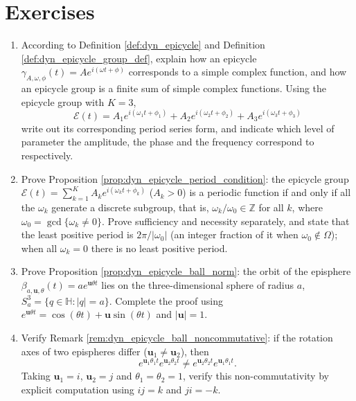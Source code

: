 \section*{Exercises}

\begin{enumerate}[leftmargin=3em, label=\textbf{Exercise \arabic*}]
    \item According to Definition \ref{def:dyn_epicycle} and Definition \ref{def:dyn_epicycle_group_def},
    explain how an epicycle $\gamma_{A,\omega,\phi}(t)=Ae^{i(\omega t+\phi)}$
    corresponds to a simple complex function, and how an epicycle group is a finite sum of simple complex functions.
    Using the epicycle group with $K=3$,
    \[
    \mathcal{E}(t)=A_1e^{i(\omega_1 t+\phi_1)}+A_2e^{i(\omega_2 t+\phi_2)}+A_3e^{i(\omega_3 t+\phi_3)}
    \]
    write out its corresponding period series form, and indicate which level of parameter the amplitude, the phase and the frequency correspond to respectively.

    \item Prove Proposition \ref{prop:dyn_epicycle_period_condition}:
    the epicycle group $\mathcal{E}(t)=\sum_{k=1}^K A_k e^{i(\omega_k t+\phi_k)}$ ($A_k>0$)
    is a periodic function if and only if all the $\omega_k$ generate a discrete subgroup,
    that is, $\omega_k/\omega_0\in\mathbb{Z}$ for all $k$, where $\omega_0=\gcd\{\omega_k\ne0\}$.
    Prove sufficiency and necessity separately, and state that the least positive period is $2\pi/\lvert\omega_0\rvert$ (an integer fraction of it when $\omega_0\notin\Omega$); when all $\omega_k=0$ there is no least positive period.

    \item Prove Proposition \ref{prop:dyn_epicycle_ball_norm}:
    the orbit of the episphere $\beta_{a,\mathbf{u},\theta}(t)=ae^{\mathbf{u}\theta t}$
    lies on the three-dimensional sphere of radius $a$, $S^3_a=\{q\in\mathbb{H}:|q|=a\}$.
    Complete the proof using $e^{\mathbf{u}\theta t}=\cos(\theta t)+\mathbf{u}\sin(\theta t)$
    and $|\mathbf{u}|=1$.

    \item Verify Remark \ref{rem:dyn_epicycle_ball_noncommutative}:
    if the rotation axes of two epispheres differ ($\mathbf{u}_1\neq\mathbf{u}_2$), then
    \[
    e^{\mathbf{u}_1\theta_1 t}e^{\mathbf{u}_2\theta_2 t}
    \neq e^{\mathbf{u}_2\theta_2 t}e^{\mathbf{u}_1\theta_1 t}.
    \]
    Taking $\mathbf{u}_1=i$, $\mathbf{u}_2=j$ and $\theta_1=\theta_2=1$,
    verify this non-commutativity by explicit computation using $ij=k$ and $ji=-k$.


\end{enumerate}
